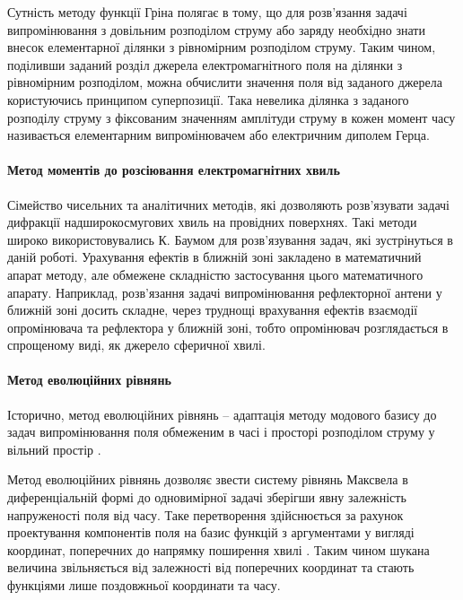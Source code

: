 Сутність методу функції Гріна полягає в тому, що для розв'язання задачі 
випромінювання з довільним розподілом струму або заряду необхідно знати 
внесок елементарної ділянки з рівномірним розподілом струму. Таким чином, 
поділивши заданий розділ джерела електромагнітного поля на ділянки з 
рівномірним розподілом, можна обчислити значення поля від заданого джерела 
користуючись принципом суперпозиції. Така невелика ділянка з заданого розподілу 
струму з фіксованим значенням амплітуди струму в кожен момент часу називається
елементарним випромінювачем або електричним диполем Герца.

\paragraph{Метод моментів до розсіювання електромагнітних хвиль}

Сімейство чисельних та аналітичних методів, які дозволяють розв'язувати
задачі дифракції надширокосмугових хвиль на провідних поверхнях.
Такі методи широко використовувались К. Баумом для розв'язування задач, які 
зустрінуться в даній роботі. Урахування ефектів в ближній зоні закладено в
математичний апарат методу, але обмежене складністю застосування цього 
математичного апарату. Наприклад, розв'язання задачі випромінювання 
рефлекторної антени у ближній зоні досить складне, через труднощі врахування 
ефектів взаємодії опромінювача та рефлектора у ближній зоні, тобто 
опромінювач розглядається в спрощеному виді, як джерело сферичної хвилі.

\paragraph{Метод еволюційних рівнянь}

Історично, метод еволюційних рівнянь -- адаптація методу модового базису 
\cite{imp:Tretyakov1986} до задач випромінювання поля обмеженим в часі і 
просторі розподілом струму у вільний простір \cite{imp:Tretyakov2004}.

Метод еволюційних рівнянь дозволяє звести систему рівнянь Максвела в 
диференціальній формі до одновимірної задачі зберігши явну залежність 
напруженості поля від часу. Таке перетворення здійснюється за рахунок 
проектування компонентів поля на базис функцій з аргументами у вигляді 
координат, поперечних до напрямку поширення хвилі \cite{imp:Dumin2010}. 
Таким чином шукана величина звільняється від залежності від поперечних 
координат та стають функціями лише поздовжньої координати та часу.

